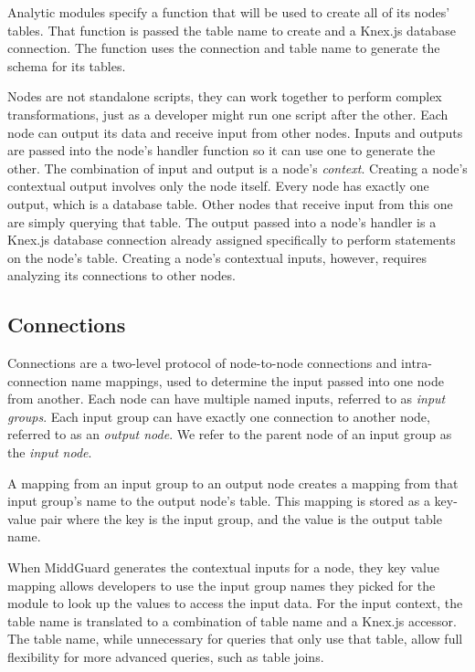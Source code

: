 \documentclass[midd]{thesis}
\begin{document}
Analytic modules specify a function that will be used to create all of its
nodes' tables. That function is passed the table name to create and a Knex.js
database connection. The function uses the connection and table name to generate
the schema for its tables.

Nodes are not standalone scripts, they can work together to perform complex
transformations, just as a developer might run one script after the other. Each
node can output its data and receive input from other nodes. Inputs and outputs
are passed into the node's handler function so it can use one to generate the
other. The combination of input and output is a node's \textit{context}.
Creating a node's contextual output involves only the node itself. Every node
has exactly one output, which is a database table. Other nodes that receive
input from this one are simply querying that table. The output passed into a
node's handler is a Knex.js database connection already assigned specifically to
perform statements on the node's table. Creating a node's contextual inputs,
however, requires analyzing its connections to other nodes.

\subsection{Connections}

Connections are a two-level protocol of node-to-node connections and
intra-connection name mappings, used to determine the input passed into one node
from another. Each node can have multiple named inputs, referred to as
\textit{input groups}. Each input group can have exactly one connection to
another node, referred to as an \textit{output node}. We refer to the parent
node of an input group as the \textit{input node}.

A mapping from an input group to an output node creates a mapping from that
input group's name to the output node's table. This mapping is stored as a
key-value pair where the key is the input group, and the value is the output
table name.

When MiddGuard generates the contextual inputs for a node, they key value
mapping allows developers to use the input group names they picked for the
module to look up the values to access the input data. For the input context,
the table name is translated to a combination of table name and a Knex.js
accessor. The table name, while unnecessary for queries that only use that
table, allow full flexibility for more advanced queries, such as table joins.
\end{document}
